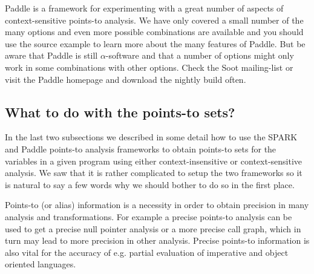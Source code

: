 \documentclass{article}
\begin{document}


Paddle is a framework for experimenting with a great number of aspects
of context-sensitive points-to analysis. We have only covered a small
number of the many options and even more possible combinations are
available and you should use the source example to learn more about
the many features of Paddle. But be aware that Paddle is still
$\alpha$-software and that a number of options might only work in some
combinations with other options. Check the Soot mailing-list or visit
the Paddle homepage and download the nightly build often.

\subsection{What to do with the points-to sets?}
In the last two subsections we described in some detail how to use the
SPARK and Paddle points-to analysis frameworks to obtain points-to
sets for the variables in a given program using either
context-insensitive or context-sensitive analysis. We saw that it is
rather complicated to setup the two frameworks so it is natural to say
a few words why we should bother to do so in the first place.

Points-to (or alias) information is a necessity in order to obtain
precision in many analysis and transformations. For example a precise
points-to analysis can be used to get a precise null pointer analysis
or a more precise call graph, 
which in turn may lead to more precision in other analysis. Precise
points-to information is also vital for the accuracy of e.g. partial
evaluation of imperative and object oriented languages.
\end{document}
